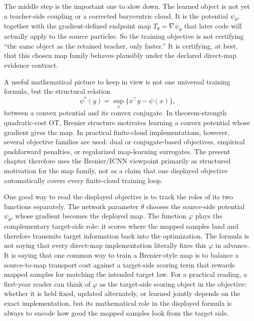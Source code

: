 The middle step is the important one to slow down.  The learned object is not yet
a teacher-side coupling or a corrected barycentric cloud.  It is the potential
\(\psi_\theta\), together with the gradient-defined endpoint map
\(T_\theta=\nabla\psi_\theta\) that later code will actually apply to the source
particles.  So the training objective is not certifying ``the same object as the
retained teacher, only faster.''  It is certifying, at best, that this chosen map
family behaves plausibly under the declared direct-map evidence contract.

A useful mathematical picture to keep in view is not one universal training
formula, but the structural relation
\begin{equation}
\label{eq:bf-neural-ot-direct-conjugate}
  \psi^*(y)=\sup_x\{x^\top y-\psi(x)\},
\end{equation}
between a convex potential and its convex conjugate.  In theorem-strength
quadratic-cost OT, Brenier structure motivates learning a convex potential whose
gradient gives the map.  In practical finite-cloud implementations, however,
several objective families are used: dual or conjugate-based objectives,
empirical pushforward penalties, or regularized map-learning surrogates.  The
present chapter therefore uses the Brenier/ICNN viewpoint primarily as
structured motivation for the map family, not as a claim that one displayed
objective automatically covers every finite-cloud training loop.

One good way to read the displayed objective is to track the roles of its two
functions separately.  The network parameter \(\theta\) chooses the source-side
potential \(\psi_\theta\), whose gradient becomes the deployed map.  The function
\(\varphi\) plays the complementary target-side role: it scores where the mapped
samples land and therefore transmits target information back into the optimization.
The formula is not saying that every direct-map implementation literally fixes this
\(\varphi\) in advance.  It is saying that one common way to train a Brenier-style
map is to balance a source-to-map transport cost against a target-side scoring term
that rewards mapped samples for matching the intended target law.  For a practical
reading, a first-year reader can think of \(\varphi\) as the target-side scoring
object in the objective: whether it is held fixed, updated alternately, or learned
jointly depends on the exact implementation, but its mathematical role in the
displayed formula is always to encode how good the mapped samples look from the
target side.

